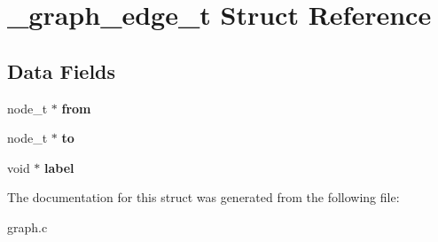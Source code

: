 \hypertarget{struct__graph__edge__t}{}\section{\+\_\+graph\+\_\+edge\+\_\+t Struct Reference}
\label{struct__graph__edge__t}
\subsection*{Data Fields}
\begin{DoxyCompactItemize}
\item 
\hypertarget{struct__graph__edge__t_ab2983067ad94365a97e9140e20db92d3}{}node\+\_\+t $\ast$ {\bfseries from}\label{struct__graph__edge__t_ab2983067ad94365a97e9140e20db92d3}

\item 
\hypertarget{struct__graph__edge__t_a69b60911daca4f0f36336c3efd405c4b}{}node\+\_\+t $\ast$ {\bfseries to}\label{struct__graph__edge__t_a69b60911daca4f0f36336c3efd405c4b}

\item 
\hypertarget{struct__graph__edge__t_a046ac2394056ee1f564727b634e56af1}{}void $\ast$ {\bfseries label}\label{struct__graph__edge__t_a046ac2394056ee1f564727b634e56af1}

\end{DoxyCompactItemize}


The documentation for this struct was generated from the following file\+:\begin{DoxyCompactItemize}
\item 
graph.\+c\end{DoxyCompactItemize}
